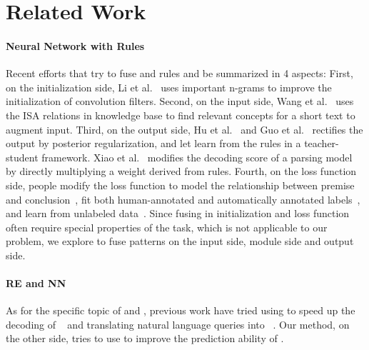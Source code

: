 \section{Related Work}

\paragraph{Neural Network with Rules}
Recent efforts that try to fuse \NN and rules and be summarized in 4 aspects:
First, on the initialization side, Li et al.~ uses important n-grams to improve the initialization of convolution filters.
Second, on the input side, Wang et al.~ uses the ISA relations in knowledge base to find relevant concepts for a short text to augment input.
Third, on the output side, Hu et al.~ and Guo et al.~ rectifies the \NN output by posterior regularization, and let \NN learn from the rules in a teacher-student framework. 
Xiao et al.~ modifies the decoding score of a parsing model by directly multiplying a weight derived from rules. 
Fourth, on the loss function side, people modify the loss function to model the relationship between premise and conclusion~\cite{demeester2016lifted}, fit both human-annotated and automatically annotated labels~\cite{alashkar2017examples}, and learn from unlabeled data~\cite{xu2017semantic}.
Since fusing in initialization and loss function often require special properties of the task, which is not applicable to our problem, we explore to fuse \RE patterns on the input side, \NN module side and output side.   

\paragraph{RE and NN}
As for the specific topic of \RE and \NN, previous work have tried using \RE to speed up the decoding of \NN~\cite{strauss2016regular} and translating natural language queries into \REs~\cite{locascio2016neural}. Our method, on the other side, tries to use \RE to improve the prediction ability of \NN.

